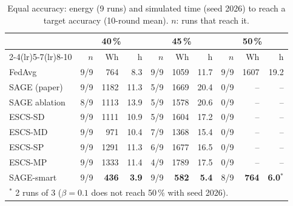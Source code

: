 \documentclass[11pt,a4paper]{article}
\begin{document}
\begin{table}[H]
\centering
\small
\caption{Equal accuracy: energy (9 runs) and simulated time (seed 2026) to
reach a target accuracy (10-round mean). $n$: runs that reach it.}
\label{tab:iso}
\setlength{\tabcolsep}{4pt}
\begin{tabular}{lrrrrrrrrr}
\toprule
& \multicolumn{3}{c}{40\,\%} & \multicolumn{3}{c}{45\,\%} & \multicolumn{3}{c}{50\,\%} \\
\cmidrule(lr){2-4}\cmidrule(lr){5-7}\cmidrule(lr){8-10}
& $n$ & Wh & h & $n$ & Wh & h & $n$ & Wh & h \\
\midrule
FedAvg        & 9/9 &  764 &  8.3 & 9/9 & 1059 & 11.7 & 9/9 & 1607 & 19.2 \\
SAGE (paper)  & 9/9 & 1182 & 11.3 & 5/9 & 1669 & 20.4 & 0/9 & -- & -- \\
SAGE ablation & 8/9 & 1113 & 13.9 & 5/9 & 1578 & 20.6 & 0/9 & -- & -- \\
ESCS-SD       & 9/9 & 1111 & 10.9 & 5/9 & 1604 & 17.2 & 0/9 & -- & -- \\
ESCS-MD       & 9/9 &  971 & 10.4 & 7/9 & 1368 & 15.4 & 0/9 & -- & -- \\
ESCS-SP       & 9/9 & 1291 & 11.3 & 6/9 & 1677 & 16.5 & 0/9 & -- & -- \\
ESCS-MP       & 9/9 & 1333 & 11.4 & 4/9 & 1789 & 17.5 & 0/9 & -- & -- \\
SAGE-smart    & 9/9 & \textbf{436} & \textbf{3.9} & 9/9 & \textbf{582} & \textbf{5.4} & 8/9 & \textbf{764} & \textbf{6.0}$^{*}$ \\
\bottomrule
\multicolumn{10}{l}{\footnotesize $^{*}$ 2 runs of 3 ($\beta=0.1$ does not reach 50\,\% with seed 2026).}
\end{tabular}
\end{table}
\end{document}
